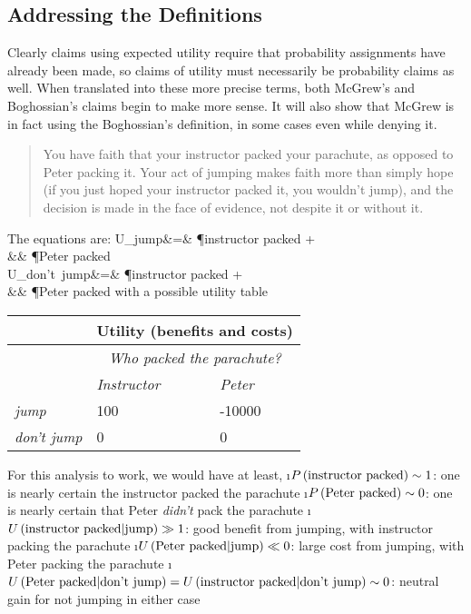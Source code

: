 \subsection{Addressing the Definitions}\label{addressing-the-definitions}

Clearly claims using expected utility require that probability
assignments have already been made, so claims of utility must
necessarily be probability claims as well. When translated into these
more precise terms, both McGrew's and Boghossian's claims begin to make more
sense. It will also show that McGrew is in fact using the Boghossian's definition, in
some cases even while denying it.

\begin{quote}
You have faith that your instructor packed your parachute, as opposed to Peter packing it.  Your act of jumping makes faith more than simply hope (if you just hoped your instructor packed it, you wouldn't jump), and the decision is made in the face of evidence, not despite it or without
it.
\end{quote}

The equations are:
\beqn
\langle U_{\mbox{jump}}\rangle &=& \P{instructor packed}\times {} + \\
&& \P{Peter packed}\times {} \\
\langle U_{\mbox{don't jump}}\rangle &=& \P{instructor packed}\times {} + \\
&& \P{Peter packed}\times {}
\eeqn
with a possible utility table

\begin{tabular}{@{}lll@{}}
\toprule
 & \multicolumn{2}{c}{\textbf{Utility (benefits and costs)}}  \\ \midrule
 & \multicolumn{2}{c}{{\em Who packed the parachute?}}  \\ 
  & \textit{Instructor } & \textit{Peter}\\
\textit{jump} & 100 & -10000   \\
\textit{don't jump} & 0 & 0  \\ \bottomrule
\end{tabular}
\vspace{.1in}

For this analysis to work, we would have at least,
\bi
\i $\P{instructor packed} \sim 1$: one is nearly certain the instructor packed the parachute
\i $\P{Peter packed} \sim 0$: one is nearly certain that Peter {\em didn't} pack the parachute
\i $\Ug{instructor packed}{jump}\gg 1$: good benefit from jumping, with instructor packing the  parachute
\i $\Ug{Peter packed}{jump}\ll 0$: large cost  from jumping, with Peter packing the  parachute
\i $\Ug{Peter packed}{don't jump}=\Ug{instructor packed}{don't jump}\sim 0$: neutral gain for not jumping in either case
\ei

